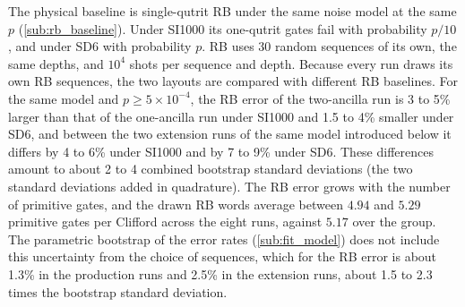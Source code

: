 The physical baseline is single-qutrit RB under the same noise model at the same $p$ (\autoref{sub:rb_baseline}). Under SI1000 its one-qutrit gates fail with probability $p/10$, and under SD6 with probability $p$. RB uses 30 random sequences of its own, the same depths, and $10^4$ shots per sequence and depth. Because every run draws its own RB sequences, the two layouts are compared with different RB baselines. For the same model and $p \ge 5\times10^{-4}$, the RB error of the two-ancilla run is 3 to 5\% larger than that of the one-ancilla run under SI1000 and 1.5 to 4\% smaller under SD6, and between the two extension runs of the same model introduced below it differs by 4 to 6\% under SI1000 and by 7 to 9\% under SD6. These differences amount to about 2 to 4 combined bootstrap standard deviations (the two standard deviations added in quadrature). The RB error grows with the number of primitive gates, and the drawn RB words average between $4.94$ and $5.29$ primitive gates per Clifford across the eight runs, against $5.17$ over the group. The parametric bootstrap of the error rates (\autoref{sub:fit_model}) does not include this uncertainty from the choice of sequences, which for the RB error is about 1.3\% in the production runs and 2.5\% in the extension runs, about 1.5 to 2.3 times the bootstrap standard deviation.

